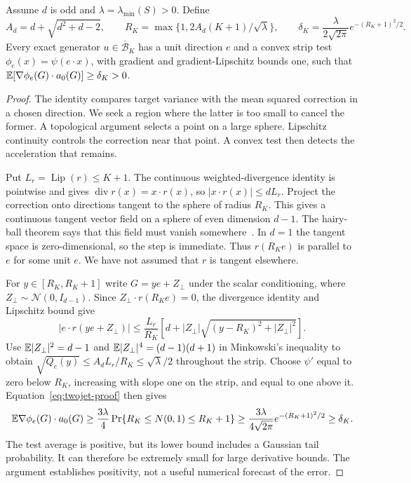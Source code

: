 \begin{lemma}
\label{lem:pole}
Assume $d$ is odd and $\lambda=\lambda_{\min}(S)>0$. Define
\begin{equation}
 A_d=d+\sqrt{d^2+d-2},\qquad
 R_K=\max\{1,2A_d(K+1)/\sqrt\lambda\},\qquad
 \delta_K=\frac{\lambda}{2\sqrt{2\pi}}e^{-(R_K+1)^2/2}.
 \label{eq:pole-constants}
\end{equation}
Every exact generator $u\in\overline{\mathcal B}_K$ has a unit direction $e$
and a convex strip test $\phi_e(x)=\psi(e\cdot x)$, with gradient and
gradient-Lipschitz bounds one, such that
$\mathbb E[\nabla\phi_e(G)\cdot a_0(G)]\ge\delta_K>0$.
\end{lemma}
\begin{proof}
The identity compares target variance with the mean squared correction in a
chosen direction. We seek a region where the latter is too small to cancel
the former. A topological argument selects a point on a large sphere.
Lipschitz continuity controls the correction near that point. A convex test
then detects the acceleration that remains.

Put $L_r=\operatorname{Lip}(r)\le K+1$. The continuous weighted-divergence
identity is pointwise and gives
$\operatorname{div}r(x)=x\cdot r(x)$, so $|x\cdot r(x)|\le dL_r$.
Project the correction onto directions tangent to the sphere of radius
$R_K$. This gives a continuous tangent vector field on a sphere of even
dimension $d-1$. The hairy-ball theorem says that this field must vanish
somewhere~\citep{hatcher2002algebraic}. In $d=1$ the tangent space is
zero-dimensional, so the step is immediate. Thus $r(R_Ke)$ is parallel to
$e$ for some unit $e$. We have not assumed that $r$ is tangent elsewhere.

For $y\in[R_K,R_K+1]$ write $G=ye+Z_\perp$ under the scalar conditioning,
where $Z_\perp\sim\mathcal N(0,I_{d-1})$. Since
$Z_\perp\cdot r(R_Ke)=0$, the divergence identity and Lipschitz bound give
\[
 |e\cdot r(ye+Z_\perp)|\le\frac{L_r}{R_K}
 \left[d+|Z_\perp|\sqrt{(y-R_K)^2+|Z_\perp|^2}\right].
\]
Use $\mathbb E|Z_\perp|^2=d-1$ and
$\mathbb E|Z_\perp|^4=(d-1)(d+1)$ in Minkowski's inequality to obtain
$\sqrt{Q_e(y)}\le A_dL_r/R_K\le\sqrt\lambda/2$ throughout the strip.
Choose $\psi'$ equal to zero below $R_K$, increasing with slope one
on the strip, and equal to one above it. Equation~\eqref{eq:twojet-proof}
then gives
\[
 \mathbb E\nabla\phi_e(G)\cdot a_0(G)
 \ge\frac{3\lambda}{4}\Pr\{R_K\le N(0,1)\le R_K+1\}
 \ge\frac{3\lambda}{4\sqrt{2\pi}}e^{-(R_K+1)^2/2}\ge\delta_K.
\]
The test average is positive, but its lower bound includes a Gaussian tail
probability. It can therefore be extremely small for large derivative
bounds. The argument establishes positivity, not a useful numerical
forecast of the error.
\end{proof}

